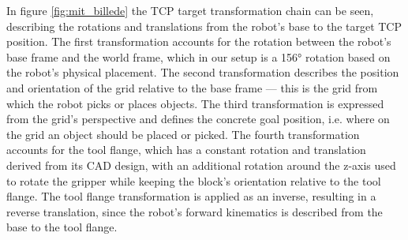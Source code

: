 In figure \ref{fig:mit_billede} the TCP target transformation chain can be seen, describing the rotations and translations from the robot's base to the target TCP position. The first transformation accounts for the rotation between the robot's base frame and the world frame, which in our setup is a 156° rotation based on the robot's physical placement. The second transformation describes the position and orientation of the grid relative to the base frame — this is the grid from which the robot picks or places objects. The third transformation is expressed from the grid's perspective and defines the concrete goal position, i.e. where on the grid an object should be placed or picked. The fourth transformation accounts for the tool flange, which has a constant rotation and translation derived from its CAD design, with an additional rotation around the z-axis used to rotate the gripper while keeping the block's orientation relative to the tool flange. The tool flange transformation is applied as an inverse, resulting in a reverse translation, since the robot's forward kinematics is described from the base to the tool flange.

